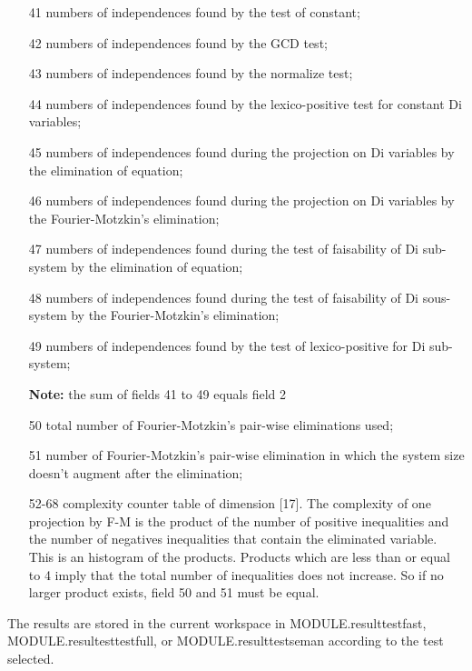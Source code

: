 \documentclass[a4paper]{report}
\begin{document}
\begin{itemize}
    {\bf Note:} the fields 26 to 40 must be less than or equal to
    the corresponding fields 11 to 25

  \item[41] numbers of independences found by the test of constant;
  \item[42] numbers of independences found by the GCD test;
  \item[43] numbers of independences found by the normalize test;
  \item[44] numbers of independences found by the lexico-positive test
             for constant Di variables;
  \item[45] numbers of independences found during the projection on Di
            variables by the elimination of equation;
  \item[46] numbers of independences found during the projection on Di
            variables by the Fourier-Motzkin's elimination;
  \item[47] numbers of independences found during the test of
            faisability of  Di sub-system by the elimination of equation;
  \item[48] numbers of independences found during the test of
            faisability of Di sous-system by the Fourier-Motzkin's
            elimination;
  \item[49] numbers of independences found by the test of lexico-positive
            for Di sub-system;

    {\bf Note:} the sum of fields 41 to 49 equals field 2

  \item[50] total number of Fourier-Motzkin's pair-wise eliminations
     used;
  \item[51] number of Fourier-Motzkin's pair-wise elimination
    in which the system size doesn't augment after the elimination;
  \item[52-68] complexity counter table of dimension [17]. The
               complexity of one projection by F-M is the product of the
               number of positive inequalities and the number of negatives
               inequalities that contain the eliminated variable. This
    is an histogram of the products. Products which are less than
    or equal to 4
    imply that the total number of inequalities does not increase.
    So if no larger product exists, field 50 and 51 must be equal.
\end{itemize}

The results are stored in the current workspace in MODULE.resulttestfast,
MODULE.resultesttestfull, or MODULE.resulttestseman according to the
test selected.
\end{document}
